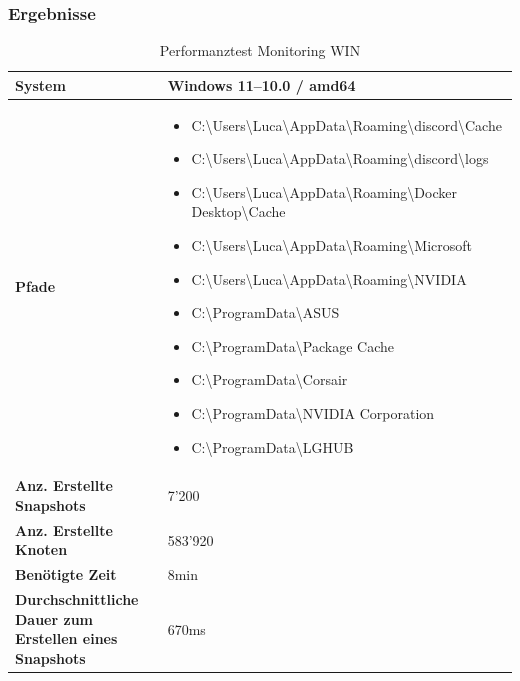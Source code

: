 \documentclass[a4paper,12pt]{report}
\begin{document}
    \subsubsection{Ergebnisse}
    \begin{table}[h!]
        \centering
        \setlength{\leftmargini}{0.8cm}
        \begin{tabular}{|p{5cm}|p{10cm}|}
            \hline
            \textbf{System}                                                & Windows 11--10.0 / amd64 \\ \hline
            \textbf{Pfade} &
            \begin{itemize}
                \item C:\textbackslash Users\textbackslash Luca\textbackslash AppData\textbackslash Roaming\textbackslash discord\textbackslash Cache
                \item C:\textbackslash Users\textbackslash Luca\textbackslash AppData\textbackslash Roaming\textbackslash discord\textbackslash logs
                \item C:\textbackslash Users\textbackslash Luca\textbackslash AppData\textbackslash Roaming\textbackslash Docker Desktop\textbackslash Cache
                \item C:\textbackslash Users\textbackslash Luca\textbackslash AppData\textbackslash Roaming\textbackslash Microsoft
                \item C:\textbackslash Users\textbackslash Luca\textbackslash AppData\textbackslash Roaming\textbackslash NVIDIA
                \item C:\textbackslash ProgramData\textbackslash ASUS
                \item C:\textbackslash ProgramData\textbackslash Package Cache
                \item C:\textbackslash ProgramData\textbackslash Corsair
                \item C:\textbackslash ProgramData\textbackslash NVIDIA Corporation
                \item C:\textbackslash ProgramData\textbackslash LGHUB
            \end{itemize}
            \\ \hline
            \textbf{Anz. Erstellte Snapshots}                              & 7'200                    \\ \hline
            \textbf{Anz. Erstellte Knoten}                                 & 583'920                  \\ \hline
            \textbf{Benötigte Zeit}                                        & 8min                     \\ \hline
            \textbf{Durchschnittliche Dauer zum Erstellen eines Snapshots} & 670ms                    \\ \hline
        \end{tabular}
        \caption{Performanztest Monitoring WIN}\label{tab:perf-monitoring-win}
    \end{table}
\end{document}
